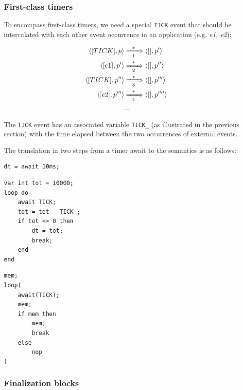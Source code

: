 \documentclass{sigplanconf}
\newcommand{\code}[1] {{\small{\texttt{#1}}}}
\newcommand{\LL}{\langle}
\newcommand{\RR}{\rangle}
\newcommand{\1}{\;}
\newcommand{\2}{\;\;}
\newcommand{\3}{\;\;\;}
\newcommand{\5}{\;\;\;\;\;}
\begin{document}
\subsubsection{First-class timers}

To encompass first-class timers, we need a special \code{TICK} event that 
should be intercalated with each other event occurrence in an application (e.g.  
\emph{e1, e2}):

\begin{align*}
\LL [TICK], p \RR
    & \xRightarrow[~~1~~]{*}
\LL [    ], p' \RR
\\
\LL [e1], p' \RR
    & \xRightarrow[~~2~~]{*}
\LL [  ], p'' \RR
\\
\LL [TICK], p'' \RR
    & \xRightarrow[~~3~~]{*}
\LL [    ], p''' \RR
\\
\LL [e2], p''' \RR
    & \xRightarrow[~~4~~]{*}
\LL [  ], p'''' \RR
\\
& ...
\end{align*}

The \code{TICK} event has an associated variable \code{TICK\_} (as illustrated 
in the previous section) with the time elapsed between the two occurrences of 
external events.

The translation in two steps from a timer await to the semantics is as follows:

\noindent
\begin{minipage}[t]{0.30\linewidth}
\begin{lstlisting}
dt = await 10ms;
\end{lstlisting}
\end{minipage}
%
\begin{minipage}[t]{0.37\linewidth}
\begin{lstlisting}
var int tot = 10000;
loop do
    await TICK;
    tot = tot - TICK_;
    if tot <= 0 then
        dt = tot;
        break;
    end
end
\end{lstlisting}
\end{minipage}
%
\begin{minipage}[t]{0.30\linewidth}
\begin{lstlisting}
mem;
loop(
    await(TICK);
    mem;
    if mem then
        mem;
        break
    else
        nop
)
\end{lstlisting}
\end{minipage}

\subsubsection{Finalization blocks}
\label{sec.formal.fins}
\end{document}
